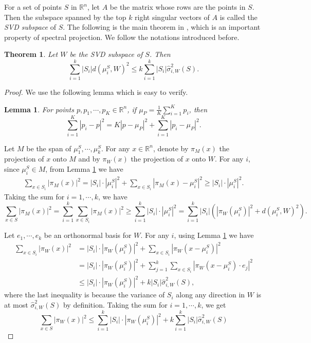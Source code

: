 \documentclass[11pt,letter]{article}
\newtheorem{theorem}{Theorem}
\newtheorem{lemma}{Lemma}
\begin{document}
For a set of points $S$ in $\mathbb R^n$, let $A$ be the matrix whose rows are the points in $S$. Then the subspace spanned by the top $k$ right singular vectors of $A$ is called the \emph{SVD subspace} of $S$. The following is the main theorem in \cite{Kannan08spectral}, which is an important property of spectral projection. We follow the notations introduced before.

\begin{theorem}\label{thm:spectral-svd}
Let $W$ be the SVD subspace of $S$. Then
\[
\sum_{i=1}^k |S_i| d(\mu_i^S, W)^2 \le k \sum_{i=1}^k |S_i| \hat \sigma_{i, W}^2(S).
\]
\end{theorem}
\begin{proof}
We use the following lemma which is easy to verify.
\begin{lemma}\label{lem:pythagorean}
For points $p, p_1, \cdots, p_K \in \mathbb R^n$, if $\mu_{P} = \frac1K\sum_{i=1}^K p_i$, then
\[
\sum_{i=1}^K |p_i - p|^2 = K|p - \mu_P|^2 + \sum_{i=1}^K |p_i - \mu_P|^2.
\]
\end{lemma}

Let $M$ be the span of $\mu_1^S, \cdots, \mu_k^S$. For any $x\in \mathbb R^n$, denote by $\pi_M(x)$ the projection of $x$ onto $M$ and by $\pi_W(x)$ the projection of $x$ onto $W$. For any $i$, since $\mu_i^S \in M$, from Lemma \ref{lem:pythagorean} we have
\begin{equation*}
\begin{aligned}
\sum_{x\in S_i} |\pi_M(x)|^2 = |S_i|\cdot|\mu_i^S|^2 + \sum_{x\in S_i} |\pi_M(x) - \mu_i^S|^2 
\ge |S_i|\cdot|\mu_i^S|^2.
\end{aligned}
\end{equation*}
Taking the sum for $i=1, \cdots, k$, we have
\begin{equation} \label{eqn1-svd-thm}
\sum_{x\in S}|\pi_M(x)|^2 = \sum_{i=1}^k \sum_{x\in S_i} |\pi_M(x)|^2
\ge \sum_{i=1}^k |S_i|\cdot|\mu_i^S|^2
= \sum_{i=1}^k |S_i| \left( |\pi_W(\mu_i^S)|^2 + d(\mu_i^S, W)^2 \right).
\end{equation}

Let $e_1, \cdots, e_k$ be an orthonormal basis for $W$. For any $i$, using Lemma \ref{lem:pythagorean} we have
\begin{equation*}
\begin{aligned}
\sum_{x\in S_i} |\pi_W(x)|^2 &= |S_i|\cdot|\pi_W(\mu_i^S)|^2 + \sum_{x\in S_i} |\pi_W(x - \mu_i^S)|^2\\
&= |S_i|\cdot|\pi_W(\mu_i^S)|^2 + \sum_{j=1}^k \sum_{x\in S_i} |\pi_W(x - \mu_i^S)\cdot e_j|^2\\
&\le |S_i|\cdot|\pi_W(\mu_i^S)|^2 + k|S_i| \hat \sigma_{i, W}^2(S),
\end{aligned}
\end{equation*}
where the last inequality is because the variance of $S_i$ along any direction in $W$ is at most $\hat \sigma_{i, W}^2(S)$ by definition. Taking the sum for $i=1,\cdots,k$, we get
\begin{equation} \label{eqn2-svd-thm}
\sum_{x\in S} |\pi_W(x)|^2 \le \sum_{i=1}^k |S_i|\cdot|\pi_W(\mu_i^S)|^2 + k\sum_{i=1}^k |S_i| \hat \sigma_{i, W}^2(S)
\end{equation}


\end{proof}
\end{document}
